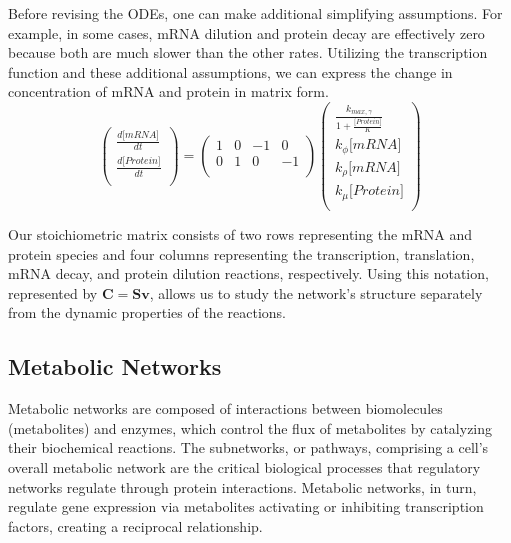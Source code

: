 \documentclass[conference]{IEEEtran}
\begin{document}
Before revising the ODEs, one can make additional simplifying assumptions. For example, in some cases, mRNA dilution and protein decay are effectively zero because both are much slower than the other rates. Utilizing the transcription function and these additional assumptions, we can express the change in concentration of mRNA and protein in matrix form.
\begin{equation}
\begin{pmatrix}
\frac{d\lbrack mRNA\rbrack}{dt} \\
\frac{d\lbrack Protein\rbrack}{dt} \\
\end{pmatrix} = \begin{pmatrix}
1 & 0 & - 1 & 0 \\
0 & 1 & 0 & - 1 \\
\end{pmatrix}\begin{pmatrix}
\frac{k_{max,\gamma}}{1 + \frac{\lbrack Protein\rbrack}{K}} \\
k_{\phi}\lbrack mRNA\rbrack \\
k_{\rho}\lbrack mRNA\rbrack \\
k_{\mu}\lbrack Protein\rbrack \\
\end{pmatrix}
\label{eq10}
\end{equation}

Our stoichiometric matrix consists of two rows representing the mRNA and protein species and four columns representing the transcription, translation, mRNA decay, and protein dilution reactions, respectively. Using this notation, represented by \begin{math}\mathbf{C} = \mathbf{Sv} \end{math}, allows us to study the network's structure separately from the dynamic properties of the reactions.

\subsection{Metabolic Networks}

Metabolic networks are composed of interactions between biomolecules (metabolites) and enzymes, which control the flux of metabolites by catalyzing their biochemical reactions\cite{b15}. The subnetworks, or pathways, comprising a cell’s overall metabolic network are the critical biological processes that regulatory networks regulate through protein interactions. Metabolic networks, in turn, regulate gene expression via metabolites activating or inhibiting transcription factors, creating a reciprocal relationship\cite{b16}.
\end{document}
